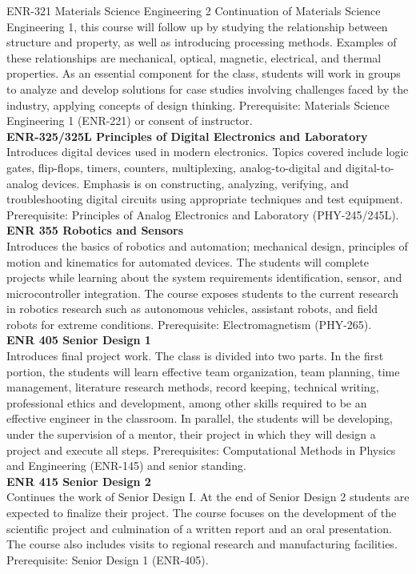 \documentclass[
  letterpaper,
]{scrbook}
\begin{document}
ENR-321 Materials Science Engineering 2 Continuation of Materials
Science Engineering 1, this course will follow up by studying the
relationship between structure and property, as well as introducing
processing methods. Examples of these relationships are mechanical,
optical, magnetic, electrical, and thermal properties. As an essential
component for the class, students will work in groups to analyze and
develop solutions for case studies involving challenges faced by the
industry, applying concepts of design thinking. Prerequisite: Materials
Science Engineering 1 (ENR-221) or consent of instructor.\\
\textbf{ENR-325/325L Principles of Digital Electronics and Laboratory}\\
Introduces digital devices used in modern electronics. Topics covered
include logic gates, flip-flops, timers, counters, multiplexing,
analog-to-digital and digital-to-analog devices. Emphasis is on
constructing, analyzing, verifying, and troubleshooting digital circuits
using appropriate techniques and test equipment. Prerequisite:
Principles of Analog Electronics and Laboratory (PHY-245/245L).\\
\textbf{ENR 355 Robotics and Sensors}\\
Introduces the basics of robotics and automation; mechanical design,
principles of motion and kinematics for automated devices. The students
will complete projects while learning about the system requirements
identification, sensor, and microcontroller integration. The course
exposes students to the current research in robotics research such as
autonomous vehicles, assistant robots, and field robots for extreme
conditions. Prerequisite: Electromagnetism (PHY-265).\\
\textbf{ENR 405 Senior Design 1}\\
Introduces final project work. The class is divided into two parts. In
the first portion, the students will learn effective team organization,
team planning, time management, literature research methods, record
keeping, technical writing, professional ethics and development, among
other skills required to be an effective engineer in the classroom. In
parallel, the students will be developing, under the supervision of a
mentor, their project in which they will design a project and execute
all steps. Prerequisites: Computational Methods in Physics and
Engineering (ENR-145) and senior standing.\\
\textbf{ENR 415 Senior Design 2}\\
Continues the work of Senior Design I. At the end of Senior Design 2
students are expected to finalize their project. The course focuses on
the development of the scientific project and culmination of a written
report and an oral presentation. The course also includes visits to
regional research and manufacturing facilities. Prerequisite: Senior
Design 1 (ENR-405).
\end{document}
